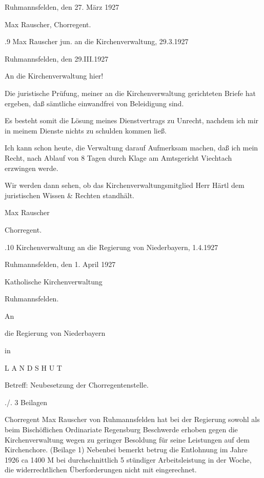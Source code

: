 \documentclass[12pt,a4paper]{book}
\begin{document}
Ruhmannsfelden, den 27. März 1927



Max Rauscher, Chorregent.

.9 Max Rauscher jun. an die Kirchenverwaltung, 29.3.1927

Ruhmannsfelden, den 29.III.1927



An die Kirchenverwaltung hier!



Die juristische Prüfung, meiner an die Kirchenverwaltung gerichteten Briefe hat
ergeben, daß sämtliche einwandfrei von Beleidigung sind.

Es besteht somit die Lösung meines Dienstvertrags zu Unrecht, nachdem ich mir in
meinem Dienste nichts zu schulden kommen ließ.

Ich kann schon heute, die Verwaltung darauf Aufmerksam machen, daß ich mein
Recht, nach Ablauf von 8 Tagen durch Klage am Amtsgericht Viechtach erzwingen
werde.

Wir werden dann sehen, ob das Kirchenverwaltungsmitglied Herr Härtl dem
juristischen Wissen & Rechten standhält.



Max Rauscher

Chorregent.

.10 Kirchenverwaltung an die Regierung von Niederbayern, 1.4.1927

Ruhmannsfelden, den 1. April 1927

Katholische Kirchenverwaltung

Ruhmannsfelden.



An

die Regierung von Niederbayern

in

    L A N D S H U T



    Betreff: Neubesetzung der Chorregentenstelle.



./. 3 Beilagen

Chorregent Max Rauscher von Ruhmannsfelden hat bei der Regierung sowohl als beim
Bischöflichen Ordinariate Regensburg Beschwerde erhoben gegen die
Kirchenverwaltung wegen zu geringer Besoldung für seine Leistungen auf dem
Kirchenchore. (Beilage 1) Nebenbei bemerkt betrug die Entlohnung im Jahre 1926
ca 1400 M bei durchschnittlich 5 stündiger Arbeitsleistung in der Woche, die
widerrechtlichen Überforderungen nicht mit eingerechnet.
\end{document}
